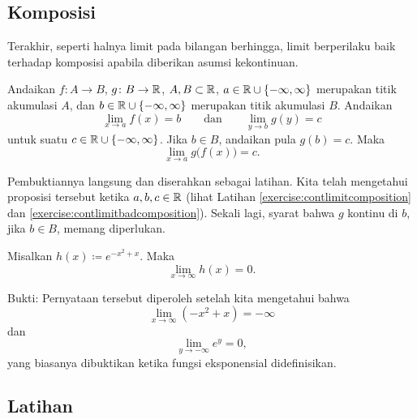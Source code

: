 \subsection{Komposisi}

Terakhir, seperti halnya limit pada bilangan berhingga,
limit berperilaku baik terhadap komposisi apabila diberikan
asumsi kekontinuan.

\begin{prop} \label{prop:inflimcompositions}
Andaikan $f \colon A \to B$, $g \colon B \to {\mathbb{R}}$, $A, B \subset {\mathbb{R}}$,
$a \in {\mathbb{R}} \cup \{ -\infty, \infty\}$ merupakan titik akumulasi $A$,
dan $b \in {\mathbb{R}} \cup \{ -\infty, \infty\}$ merupakan titik akumulasi $B$.
Andaikan
\begin{equation*}
\lim_{x \to a} f(x) = b\qquad \text{dan} \qquad \lim_{y \to b} g(y) = c
\end{equation*}
untuk suatu $c \in {\mathbb{R}} \cup \{ -\infty, \infty \}$.
Jika $b \in B$, andaikan pula $g(b) = c$.
Maka
\begin{equation*}
\lim_{x \to a} g\bigl(f(x)\bigr) = c .
\end{equation*}
\end{prop}

Pembuktiannya langsung dan diserahkan sebagai latihan.  Kita telah
mengetahui proposisi tersebut ketika $a, b, c \in {\mathbb{R}}$ (lihat Latihan
\ref{exercise:contlimitcomposition} dan
\ref{exercise:contlimitbadcomposition}).  Sekali lagi, syarat bahwa $g$
kontinu di $b$, jika $b \in B$, memang diperlukan.

\begin{example}
Misalkan $h(x) \coloneqq e^{-x^2+x}$.  Maka
\begin{equation*}
\lim_{x\to \infty} h(x) = 0 .
\end{equation*}

Bukti:
Pernyataan tersebut diperoleh setelah kita mengetahui bahwa
\begin{equation*}
\lim_{x\to \infty} (-x^2+x) = -\infty
\end{equation*}
dan
\begin{equation*}
\lim_{y\to -\infty} e^y = 0 ,
\end{equation*}
yang biasanya dibuktikan ketika fungsi eksponensial didefinisikan.
\end{example}

\subsection{Latihan}

